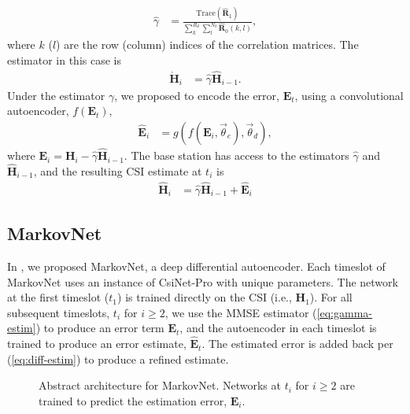 \begin{align}
	\hat \gamma &= \frac{\text{Trace}(\hat{\mathbf R}_1)}{\sum_k^{R_d}\sum_l^{N_b}\hat{\mathbf R}_0(k,l)}, \label{eq:gamma-hat}
\end{align}
where $k$ ($l$) are the row (column) indices of the correlation matrices. The estimator in this case is 
\begin{align}
	\grave{\mathbf H}_i &= \hat\gamma \hat{\mathbf H}_{i-1} \label{eq:gamma-estim}.
\end{align}
Under the estimator $\gamma$, we proposed to encode the error, $\mathbf E_t$, using a convolutional autoencoder, $f(\mathbf E_t)$,
\begin{align*}
	\hat{\mathbf E}_i &= g(f(\mathbf E_i, \vec\theta_e), \vec\theta_d),
\end{align*}
where $\mathbf E_i = \mathbf H_i - \hat\gamma\hat{\mathbf H}_{i-1}$. The base station has access to the estimators $\hat\gamma$ and $\hat{\mathbf H}_{i-1}$, and the resulting CSI estimate at $t_i$ is
\begin{align}
	\hat{\mathbf H}_i &= \hat\gamma \hat{\mathbf H}_{i-1} + \hat{\mathbf{E}}_i \label{eq:diff-estim}
\end{align}

\subsection{MarkovNet}

In \cite{ref:Liu2020MarkovNet}, we proposed MarkovNet, a deep differential autoencoder. Each timeslot of MarkovNet uses an instance of CsiNet-Pro with unique parameters. The network at the first timeslot ($t_1$) is trained directly on the CSI (i.e., $\mathbf H_1$). For all subsequent timeslots, $t_i$ for $i \geq 2$, we use the MMSE estimator (\ref{eq:gamma-estim}) to produce an error term $\mathbf E_t$, and the autoencoder in each timeslot is trained to produce an error estimate, $\hat{\mathbf E}_t$. The estimated error is added back per (\ref{eq:diff-estim}) to produce a refined estimate.

\begin{figure}[!hbtp]
    \centering
    {
      \fontsize{6pt}{8pt}
      \def\svgwidth{1.0\columnwidth}
      
    }
    \caption{Abstract architecture for MarkovNet. Networks at $t_i$ for $i \geq 2$ are trained to predict the estimation error, $\mathbf E_i$.}
    \label{fig:markovnet_schema}
\end{figure}

